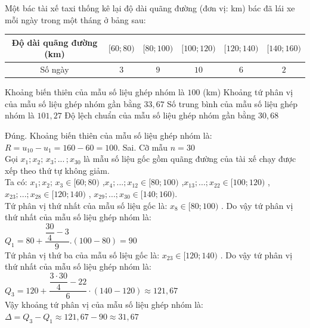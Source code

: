 \begin{ex}%
	Một bác tài xế taxi thống kê lại độ dài quãng đường (đơn vị: km) bác đã lái xe mỗi ngày trong một tháng ở bảng sau:
	
	\begin{tabular}{|c|c|c|c|c| c|}
		\hline
		Độ dài quãng đường (km) & $[60;80)$  & $[80;100)$  & $[100;120)$  & $[120;140)$  & $[140;160)$   \\
		\hline
		Số ngày & $3$  & $9$ & $10$ & $6$  & $2$  \\
		\hline
	\end{tabular}
	
	\choiceTF
	{\True Khoảng biến thiên của mẫu số liệu ghép nhóm là $100$ (km)}
	{ Khoảng tứ phân vị của mẫu số liệu ghép nhóm gần bằng  $33{,}67$}
	{ Số trung bình của mẫu số liệu ghép nhóm là   $101{,}27$}
	{Độ lệch chuẩn của mẫu số liệu ghép nhóm gần bằng $30{,}68$}
	\loigiai
	{
		\begin{itemchoice}
			\itemch Đúng. Khoảng biến thiên  của mẫu số liệu ghép nhóm là: $R = {u_{10}} - {u_1} = 160 - 60 = 100$.
			\itemch Sai. Cỡ mẫu $n = 30$ \\
			Gọi ${x_1};{x_2};\,{x_3};...\,;{x_{30}}$  là mẫu số liệu gốc gồm quãng đường của tài xế chạy được xếp theo thứ tự không giảm.\\
			Ta có: ${x_1};{x_2};\,{x_3} \in [60;80)$ ,${x_4};...;{x_{12}} \in [80;100)$  ,${x_{13}};...;{x_{22}} \in [100;120)$  , ${x_{23}};...;{x_{28}} \in [120;140)$ ,  ${x_{29}};...;{x_{30}} \in [140;160)$.\\
			Tứ phân vị thứ nhất của mẫu số liệu gốc là: ${x_8} \in [80;100)$ . Do vậy tứ phân vị thứ nhất của mẫu số liệu ghép nhóm là: \\
			${Q_1} = 80 + \dfrac{\dfrac{30}{4} - 3}{9}.(100 - 80) = 90$ \\
			Tứ phân vị thứ ba của mẫu số liệu gốc là: ${x_{23}} \in [120;140)$ . Do vậy tứ phân vị thứ nhất của mẫu số liệu ghép nhóm là: \\
			${Q_3} = 120 + \dfrac{{\dfrac{{3\cdot30}}{4} - 22}}{6}\cdot(140 - 120) \approx 121{,}67$\\
			Vậy khoảng tứ phân vị của mẫu số liệu ghép nhóm là:  $\Delta  = {Q_3} - {Q_1} \approx 121{,}67 - 90 \approx 31{,}67$
			

\end{itemchoice}}
\end{ex}
